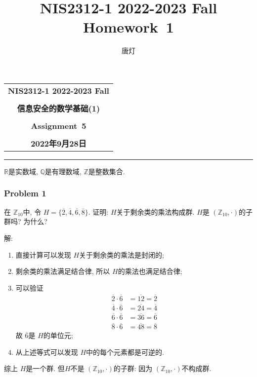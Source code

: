 \documentclass[a4paper,12pt]{ctexart}
\title{NIS2312-1 2022-2023 Fall Homework~1}
\author{唐灯}
\newcommand{\Z}{\mathbb{Z}}
\newcommand{\Q}{\mathbb{Q}}
\newcommand{\R}{\mathbb{R}}
\begin{document}
  \begin{center}

  \vspace{-0.3in}
  \begin{tabular}{c}
    \textbf{\Large NIS2312-1 2022-2023 Fall} \\
    \textbf{\Large  } \\
    \textbf{\Large  信息安全的数学基础(1)} \\
    \textbf{\Large  } \\
    \textbf{\Large  Assignment~5} \\
    \textbf{\Large  } \\
    \textbf{\Large 2022年9月28日} \\
  \end{tabular}
  \end{center}
  \noindent
  \rule{\linewidth}{0.4pt}
  
$ \R $是实数域, $ \Q $是有理数域, $ \Z $是整数集合.

\subsubsection*{Problem 1}
  在 $ \Z_{10} $中, 令 $ H=\{\overline{2},\overline{4},\overline{6},\overline{8}\} $. 证明: $ H $关于剩余类的乘法构成群. $ H $是 $ (\Z_{10},\cdot) $的子群吗? 为什么?
      
  解: \begin{enumerate}[label=(\arabic{*})]
    \item 直接计算可以发现 $ H $关于剩余类的乘法是封闭的;
    \item 剩余类的乘法满足结合律, 所以 $ H $的乘法也满足结合律;
    \item 可以验证 
    \begin{align*}
      \overline{2}\cdot\overline{6}&=\overline{12}=\overline{2}\\
      \overline{4}\cdot\overline{6}&=\overline{24}=\overline{4}\\ 
      \overline{6}\cdot\overline{6}&=\overline{36}=\overline{6}\\ 
      \overline{8}\cdot\overline{6}&=\overline{48}=\overline{8} 
    \end{align*}
    故 $ \overline{6} $是 $ H $的单位元;
    \item 从上述等式可以发现 $ H $中的每个元素都是可逆的.
  \end{enumerate}
    综上 $ H $是一个群. 但$ H $不是 $ (\Z_{10},\cdot) $的子群: 因为 $ (\Z_{10},\cdot) $不构成群.
\end{document}
